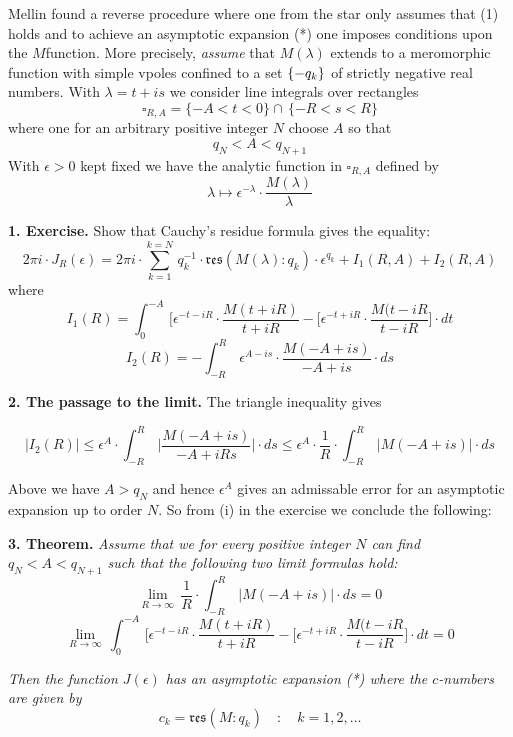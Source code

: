 \noindent
Mellin
found a reverse procedure where one from the star only assumes that
(1) holds and to achieve an asymptotic expansion (*)
one imposes conditions upon the $M$\vvv function.
More precisely, \emph{assume}  that
$M(\lambda)$ extends to a meromorphic function with simple vpoles confined to a set
$\{- q_ k\}$ of strictly negative real numbers.
With $\lambda=t+is$ we consider  line integrals over rectangles
\[
\square_{R,A}=\{-A<t<0\}\cap\, \{-R<s<R\}\tag{5}
\]
where one for  an  arbitrary positive integer $N$  choose
$A$ so that 
\[
q_N<A<q_{N+1} \tag{6}
\]
With $\epsilon>0$
kept fixed we have the analytic function in
$\square_{R,A}$  defined by
\[ 
\lambda\mapsto \epsilon^{-\lambda}\cdot \frac{M(\lambda)}{\lambda}\tag{6}
\]



\newpage

\noindent
{\bf{1. Exercise.}}
Show that Cauchy's residue formula gives the equality:
\[
2\pi i\cdot J_R(\epsilon)=
2\pi i\cdot \sum_{k=1}^{k=N}\,q_k^{-1}\cdot 
\mathfrak{res}(M(\lambda):q_k)\cdot \epsilon^{q_k}
+I_1(R,A)+I_2(R,A)\tag{i}
\]
where 
\[
I_1(R)=\int_0^{-A}\, 
\bigl[\epsilon^{-t-iR}\cdot \frac{M(t+iR)}{t+iR}-
[\epsilon^{-t+iR}\cdot \frac{M(t-iR}{t-iR}\bigr]\cdot dt\tag{ii}
\]
\[
I_2(R)=-\int_{-R}^R\,  \epsilon^{A-is}\cdot 
\frac{M(-A+is)}{-A+is}\cdot ds\tag{iii}
\]


\noindent
{\bf{2. The passage to the limit.}}
The triangle inequality gives

\[
|I_2(R)|\leq  \epsilon^A\cdot 
\int_{-R}^R\,  \bigl|\frac{M(-A+is)}{-A+iRs}\bigr|\cdot ds
\leq\epsilon^A\cdot\frac{1}{R}\cdot
\int_{-R}^R\,  \bigl|M(-A+is)\bigr|\cdot ds\tag{3.1}
\]



\medskip

\noindent
Above we have  $A>q_N$ and hence $\epsilon^A$
gives an admissable error for an asymptotic expansion
up to order $N$. So from (i) in the exercise we conclude the following:

\medskip

\noindent
{\bf{3. Theorem.}}
\emph{Assume that we for every
positive integer $N$ can find $q_N<A<q_{N+1}$
such that the following two limit formulas hold:}
\[
\lim_{R\to\infty}\,
\frac{1}{R}\cdot
\int_{-R}^R\,  \bigl|M(-A+is)\bigr|\cdot ds=0\tag{i}
\]
\[
\lim_{R\to\infty}\,\int_0^{-A}\, 
\bigl[\epsilon^{-t-iR}\cdot \frac{M(t+iR)}{t+iR}-
[\epsilon^{-t+iR}\cdot \frac{M(t-iR}{t-iR}\bigr]\cdot dt=0\tag{ii}
\]

\noindent
\emph{Then the function $J(\epsilon)$ has an asymptotic expansion  (*) where
the $c$-numbers are given by}
\[ 
c_k=\mathfrak{res}(M:q_k)\quad\colon\quad k=1,2,\ldots
\]






